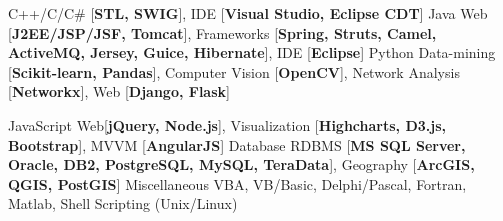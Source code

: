 \begin{cvskills}
    \cvskill
    {C++/C/C\#} %
    {[\textbf{STL, SWIG}], IDE [\textbf{Visual Studio, Eclipse CDT}]} 
    \cvskill
    {Java} %
    {Web [\textbf{J2EE/JSP/JSF, Tomcat}], Frameworks [\textbf{Spring, Struts, Camel, ActiveMQ, Jersey, Guice, Hibernate}], IDE [\textbf{Eclipse}]} 
    \cvskill
    {Python} 
    {Data-mining [\textbf{Scikit-learn, Pandas}], Computer Vision [\textbf{OpenCV}], Network Analysis [\textbf{Networkx}], Web [\textbf{Django, Flask}]} 

    \cvskill
    {JavaScript} 
    {Web[\textbf{jQuery, Node.js}], Visualization [\textbf{Highcharts, D3.js, Bootstrap}], MVVM [\textbf{AngularJS}]} 
    \cvskill
    {Database} 
    {RDBMS [\textbf{MS SQL Server, Oracle, DB2, PostgreSQL, MySQL,  TeraData}], Geography [\textbf{ArcGIS, QGIS, PostGIS}]}
    \cvskill
    {Miscellaneous} 
    {VBA, VB/Basic, Delphi/Pascal, Fortran, Matlab, Shell Scripting (Unix/Linux)}
\end{cvskills}




